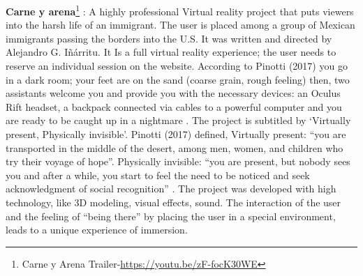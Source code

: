 \textbf{Carne y arena}\footnote{Carne y Arena Trailer-\url{https://youtu.be/zF-focK30WE}} : A highly professional
Virtual reality project that puts viewers
into the harsh life of an immigrant. The
user is placed among a group of
Mexican immigrants passing the
borders into the U.S. It was written and
directed by Alejandro G. Iñárritu. It Is a
full virtual reality experience; the user
needs to reserve an individual session
on the website. According to Pinotti (2017) you go in a dark room; your feet are on the sand (coarse grain, rough feeling) then, two assistants welcome you and provide you with the
necessary devices: an Oculus Rift headset, a backpack connected via cables to a powerful
computer and you are ready to be caught up in a nightmare \citep{Pinotti2017}. The project is
subtitled by ‘Virtually present, Physically invisible’. Pinotti (2017) defined, Virtually present:
“you are transported in the middle of the desert, among men, women, and children who try
their voyage of hope”. Physically invisible: “you are present, but nobody sees you and after a
while, you start to feel the need to be noticed and seek acknowledgment of social
recognition” \citep{Pinotti2017}. The project was developed with high technology, like 3D
modeling, visual effects, sound. The interaction of the user and the feeling of “being there”
by placing the user in a special environment, leads to a unique experience of immersion.


